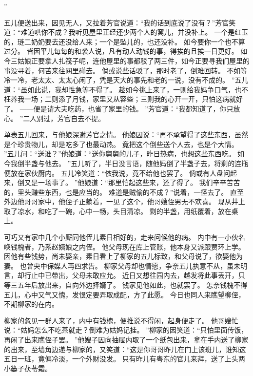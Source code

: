 ”\par
五儿便送出来，因见无人，又拉着芳官说道：“我的话到底说了没有？”芳官笑道：“难道哄你不成？我听见屋里正经还少两个人的窝儿，并没补上。
一个是红玉的，琏二奶奶要去还没给人来；一个是坠儿的，也还没补。
如今要你一个也不算过分。
皆因平儿每每的和袭人说，凡有动人动钱的事，得挨的且挨一日更好。
如今三姑娘正要拿人扎筏子呢，连他屋里的事都驳了两三件，如今正要寻我们屋里的事没寻着，何苦来往网里碰去。
倘或说些话驳了，那时老了，倒难回转。
不如等冷一冷，老太太、太太心闲了，凭是天大的事先和老的一说，没有不成的。
”五儿道：“虽如此说，我却性急等不得了。
趁如今挑上来了，一则给我妈争口气，也不枉养我一场；二则添了月钱，家里又从容些；三则我的心开一开，只怕这病就好了。
——便是请大夫吃药，也省了家里的钱。
”芳官道：“我都知道了，你只放心。
”二人别过，芳官自去不提。
\par
单表五儿回来，与他娘深谢芳官之情。
他娘因说：“再不承望得了这些东西，虽然是个珍贵物儿，却是吃多了也最动热。
竟把这个倒些送个人去，也是个大情。
”五儿问：“送谁？”他娘道：“送你舅舅的儿子，昨日热病，也想这些东西吃。
如今我倒半盏与他去。
”五儿听了，半日没言语，随他妈倒了半盏子去，将剩的连瓶便放在家伙厨内。
五儿冷笑道：“依我说，竟不给他也罢了。
倘或有人盘问起来，倒又是一场事了。
”他娘道：“那里怕起这些来，还了得了。
我们辛辛苦苦的，里头赚些东西，也是应当的。
难道是贼偷的不成？”说着，一径去了。
直至外边他哥哥家中，他侄子正躺着，一见了这个，他哥嫂侄男无不欢喜。
现从井上取了凉水，和吃了一碗，心中一畅，头目清凉。
剩的半盏，用纸覆着，放在桌上。
\par
可巧又有家中几个小厮同他侄儿素日相好的，走来问候他的病。
内中有一小伙名唤钱槐者，乃系赵姨娘之内侄。
他父母现在库上管账，他本身又派跟贾环上学。
因他有些钱势，尚未娶亲，素日看上了柳家的五儿标致，和父母说了，欲娶他为妻。
也曾央中保媒人再四求告。
柳家父母却也情愿，争奈五儿执意不从，虽未明言，却行止中已带出，父母未敢应允。
近日又想往园内去，越发将此事丢开，只等三五年后放出来，自向外边择婿了。
钱家见他如此，也就罢了。
怎奈钱槐不得五儿，心中又气又愧，发恨定要弄取成配，方了此愿。
今日也同人来瞧望柳侄，不期柳家的在内。
\par
柳家的忽见一群人来了，内中有钱槐，便推说不得闲，起身便走了。
他哥嫂忙说：“姑妈怎么不吃茶就走？倒难为姑妈记挂。
”柳家的因笑道：“只怕里面传饭，再闲了出来瞧侄子罢。
”他嫂子因向抽屉内取了一个纸包出来，拿在手内送了柳家的出来，至墙角边递与柳家的，又笑道：“这是你哥哥昨儿在门上该班儿，谁知这五日一班，竟偏冷淡，一个外财没发。
只有昨儿有粤东的官儿来拜，送了上头两小篓子茯苓霜。
